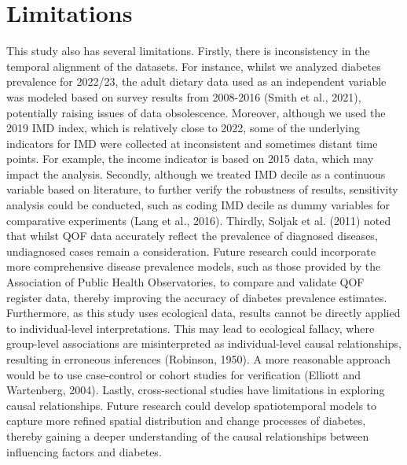\section{Limitations}
\label{chap:5.2}
This study also has several limitations. Firstly, there is inconsistency in the temporal alignment of the datasets. For instance, whilst we analyzed diabetes prevalence for 2022/23, the adult dietary data used as an independent variable was modeled based on survey results from 2008-2016 (Smith et al., 2021), potentially raising issues of data obsolescence. Moreover, although we used the 2019 IMD index, which is relatively close to 2022, some of the underlying indicators for IMD were collected at inconsistent and sometimes distant time points. For example, the income indicator is based on 2015 data, which may impact the analysis.
Secondly, although we treated IMD decile as a continuous variable based on literature, to further verify the robustness of results, sensitivity analysis could be conducted, such as coding IMD decile as dummy variables for comparative experiments (Lang et al., 2016).
Thirdly, Soljak et al. (2011) noted that whilst QOF data accurately reflect the prevalence of diagnosed diseases, undiagnosed cases remain a consideration. Future research could incorporate more comprehensive disease prevalence models, such as those provided by the Association of Public Health Observatories, to compare and validate QOF register data, thereby improving the accuracy of diabetes prevalence estimates.
Furthermore, as this study uses ecological data, results cannot be directly applied to individual-level interpretations. This may lead to ecological fallacy, where group-level associations are misinterpreted as individual-level causal relationships, resulting in erroneous inferences (Robinson, 1950). A more reasonable approach would be to use case-control or cohort studies for verification (Elliott and Wartenberg, 2004).
Lastly, cross-sectional studies have limitations in exploring causal relationships. Future research could develop spatiotemporal models to capture more refined spatial distribution and change processes of diabetes, thereby gaining a deeper understanding of the causal relationships between influencing factors and diabetes.